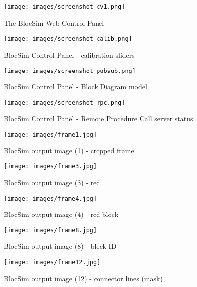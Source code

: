 \begin{figure}[ht!]
\centering
\texttt{[image: images/screenshot\_cv1.png]}
\caption{The BlocSim Web Control Panel \cite{blocsim}}
\label{im:screenshot_cv1}
\end{figure}

\begin{figure}[ht!]
\centering
\texttt{[image: images/screenshot\_calib.png]}
\caption{BlocSim Control Panel - calibration sliders \cite{blocsim}}
\label{im:screenshot_calib}
\end{figure}

\begin{figure}[ht!]
\centering
\texttt{[image: images/screenshot\_pubsub.png]}
\caption{BlocSim Control Panel - Block Diagram model \cite{blocsim}}
\label{im:screenshot_pubsub}
\end{figure}

\begin{figure}[ht!]
\centering
\texttt{[image: images/screenshot\_rpc.png]}
\caption{BlocSim Control Panel - Remote Procedure Call server status \cite{blocsim}}
\label{im:screenshot_rpc}
\end{figure}

\clearpage





\begin{figure}[ht!]
\centering
\texttt{[image: images/frame1.jpg]}
\caption{BlocSim output image (1) - cropped frame \cite{blocsim}}
\label{im:frame1}
\end{figure}

\begin{figure}[ht!]
\centering
\texttt{[image: images/frame3.jpg]}
\caption{BlocSim output image (3) - red \cite{blocsim}}
\label{im:frame3}
\end{figure}

\begin{figure}[ht!]
\centering
\texttt{[image: images/frame4.jpg]}
\caption{BlocSim output image (4) - red block \cite{blocsim}}
\label{im:frame4}
\end{figure}

\begin{figure}[ht!]
\centering
\texttt{[image: images/frame8.jpg]}
\caption{BlocSim output image (8) - block ID \cite{blocsim}}
\label{im:frame8}
\end{figure}

\begin{figure}[ht!]
\centering
\texttt{[image: images/frame12.jpg]}
\caption{BlocSim output image (12) - connector lines (mask) \cite{blocsim}}
\label{im:frame12}
\end{figure}

